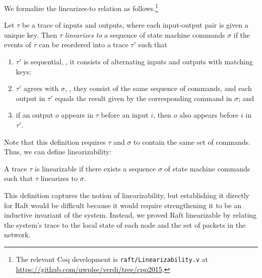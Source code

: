 We formalize the linearizes-to relation as follows.\footnote{The relevant Coq development is \texttt{raft/Linearizability.v} at \url{https://github.com/uwplse/verdi/tree/cpp2015}.}
\begin{definition}[Linearizes-to]\label{def:lin-eq}
Let $\tau$ be a trace of inputs and outputs,
where each input-output pair is given a unique key.
Then $\tau$ \textit{linearizes to}
a sequence of state machine commands $\sigma$ if
the events of $\tau$ can be reordered into a trace $\tau'$ such that
\begin{enumerate}
\item $\tau'$ is sequential,
  \ie, it consists of alternating inputs and outputs with matching keys;
\item $\tau'$ agrees with $\sigma$,
  \ie, they consist of the same sequence of commands,
       and each output in $\tau'$ equals the result given
       by the corresponding command in $\sigma$; and
\item\label{item:lin-eq-ord} if an output $o$ appears in $\tau$
  before an input $i$,
  then $o$ also appears before $i$ in $\tau'$.
\end{enumerate}
\end{definition}
Note that this definition requires $\tau$ and $\sigma$
  to contain the same set of commands.
Thus, we can define linearizability:
\begin{definition}[Linearizability]
  A trace $\tau$ is linearizable if
  there exists a sequence $\sigma$ of state machine commands
  such that $\tau$ linearizes to $\sigma$.
\end{definition}

This definition captures the notion of linearizability,
  but establishing it directly for Raft would be difficult
  because it would require strengthening it
  to be an inductive invariant of the system.
Instead, we proved Raft linearizable by relating
  the system's trace to the local state of each node
  and the set of packets in the network.

